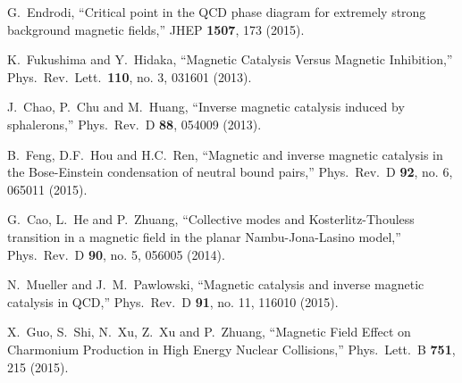 \documentclass[aps,prd,amsmath,two column,amssymb,showpacs]{revtex4}
\begin{document}
\begin{thebibliography}{99}
G.~Endrodi,
``Critical point in the QCD phase diagram for extremely strong background magnetic fields,''
JHEP {\bf 1507}, 173 (2015).%


K.~Fukushima and Y.~Hidaka,
``Magnetic Catalysis Versus Magnetic Inhibition,''
Phys.\ Rev.\ Lett.\  {\bf 110}, no. 3, 031601 (2013).%

J.~Chao, P.~Chu and M.~Huang,
``Inverse magnetic catalysis induced by sphalerons,''
Phys.\ Rev.\ D {\bf 88}, 054009 (2013).%


B.~Feng, D.F.~Hou and H.C.~Ren,
``Magnetic and inverse magnetic catalysis in the Bose-Einstein condensation of neutral bound pairs,''
Phys.\ Rev.\ D {\bf 92}, no. 6, 065011 (2015).%



G.~Cao, L.~He and P.~Zhuang,
``Collective modes and Kosterlitz-Thouless transition in a magnetic field in the planar Nambu-Jona-Lasino model,''
Phys.\ Rev.\ D {\bf 90}, no. 5, 056005 (2014).%


N.~Mueller and J.~M.~Pawlowski,
``Magnetic catalysis and inverse magnetic catalysis in QCD,''
Phys.\ Rev.\ D {\bf 91}, no. 11, 116010 (2015).%

X.~Guo, S.~Shi, N.~Xu, Z.~Xu and P.~Zhuang,
``Magnetic Field Effect on Charmonium Production in High Energy Nuclear Collisions,''
Phys.\ Lett.\ B {\bf 751}, 215 (2015).%


\end{thebibliography}
\end{document}
